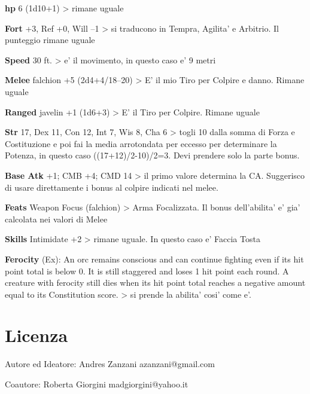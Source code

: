 \documentclass[a4paper,11pt,twoside,openany]{book}
\begin{document}
\textbf{hp} 6 (1d10+1) \textgreater{} rimane uguale

\textbf{Fort} +3, Ref +0, Will --1 \textgreater{} si traducono in Tempra, Agilita' e Arbitrio. Il punteggio rimane uguale

\textbf{Speed} 30 ft. \textgreater{} e' il movimento, in questo
caso e' 9 metri

\textbf{Melee} falchion +5 (2d4+4/18--20) \textgreater{} E' il mio Tiro per Colpire e danno. Rimane uguale

\textbf{Ranged} javelin +1 (1d6+3) \textgreater{} E' il Tiro per Colpire. Rimane uguale

\textbf{Str} 17, Dex 11, Con 12, Int 7, Wis 8, Cha 6 \textgreater{} togli 10 dalla somma di Forza e Costituzione e poi fai la media arrotondata per eccesso per determinare la Potenza, in questo caso ((17+12)/2-10)/2=3. Devi prendere solo la parte bonus.

\textbf{Base Atk} +1; CMB +4; CMD 14 \textgreater{} il primo valore determina la CA. Suggerisco di usare direttamente i bonus al colpire indicati nel melee. 

\textbf{Feats} Weapon Focus (falchion) \textgreater{} Arma Focalizzata. Il bonus dell'abilita' e' gia' calcolata nei valori di Melee

\textbf{Skills} Intimidate +2 \textgreater{} rimane uguale. In questo caso e' Faccia Tosta

\textbf{Ferocity} (Ex): An orc remains conscious and can continue fighting even if its hit point total is below 0. It is still staggered and loses 1 hit point each round. A creature with ferocity still dies when its hit point total reaches a negative amount equal to its Constitution score. \textgreater{} si prende la abilita' cosi' come e'.

\pagebreak

\twocolumn

\printindex{}

\pagebreak

\onecolumn


\label{indice-analitico}

\pagebreak

\section{Licenza}

\bigskip

Autore ed Ideatore: Andres Zanzani azanzani@gmail.com

\bigskip
Coautore: Roberta Giorgini madgiorgini@yahoo.it
\end{document}
